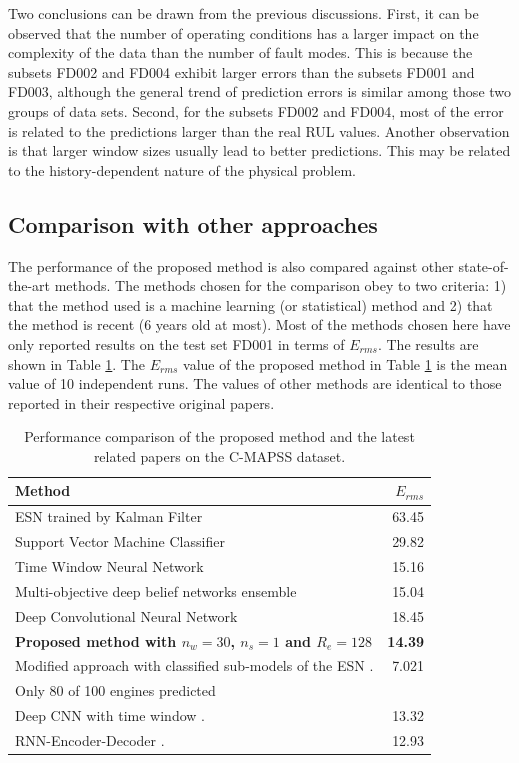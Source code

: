 \documentclass[preprint,12pt]{elsarticle}%
\begin{document}
Two conclusions can be drawn from the previous discussions. First, it can be observed that the number of operating conditions has a larger impact on the complexity of the data than the number of fault modes. This is because the subsets FD002 and FD004 exhibit larger errors than the subsets FD001 and FD003, although the general trend of prediction errors is similar among those two groups of data sets. Second, for the subsets FD002 and FD004, most of the error is related to the predictions larger than the real RUL values. Another observation is that larger window sizes usually lead to better predictions. This may be related to the history-dependent nature of the physical problem.

\subsection{Comparison with other approaches}

The performance of the proposed method is also compared against other state-of-the-art methods. The methods chosen for the comparison obey to two criteria: 1) that the method used is a machine learning (or statistical) method and 2) that the method is recent (6 years old at most). Most of the methods chosen here have only reported results on the test set FD001 in terms of $E_{rms}$. The results are shown in Table \ref{table:results_comparison}. The $E_{rms}$ value of the proposed method in Table \ref{table:results_comparison} is the mean value of 10 independent runs. The values of other methods are identical to those reported in their respective original papers.

\begin{table}[H]
\begin{center}
\begin{tabular}[c]{l|r}\hline
Method & $E_{rms}$\\\hline
ESN trained by Kalman Filter \cite{Peng2012} & 63.45\\
Support Vector Machine Classifier \cite{Louen2013} & 29.82\\
Time Window Neural Network \cite{Lim2016} & 15.16\\
Multi-objective deep belief networks ensemble \cite{Zhang2016} & 15.04\\
Deep Convolutional Neural Network \cite{Babu2016} & 18.45\\
\textbf{Proposed method with $n_{w}=30$, $n_{s}=1$ and $R_{e}=128$} & \textbf{14.39}\\
Modified approach with classified sub-models of the ESN \cite{Peng2012}. & 7.021\\
Only 80 of 100 engines predicted & \\
Deep CNN with time window \cite{Li2018}. & 13.32\\
RNN-Encoder-Decoder \cite{Malhorta2016}. & 12.93\\
\hline
\end{tabular}
\caption{Performance comparison of the proposed method and the latest related papers on the C-MAPSS dataset.}
\label{table:results_comparison}
\end{center}
\end{table}
\end{document}
